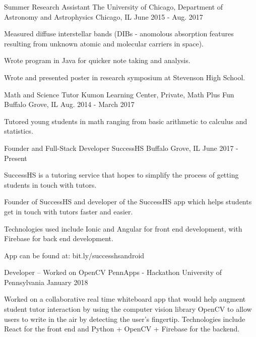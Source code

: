 \begin{cventries}
  \cventry
    {Summer Research Assistant}
    {The University of Chicago, Department of Astronomy and Astrophysics}
    {Chicago, IL}
    {June 2015 - Aug. 2017} 
    {
      \begin{cvitems}
        \item {Measured diffuse interstellar bands (DIBs - anomolous absorption features resulting from unknown atomic and molecular carriers in space).}
        \item {Wrote program in Java for quicker note taking and analysis.}
        \item {Wrote and presented poster in research symposium at Stevenson High School.}
      \end{cvitems}
    }
  \cventry
    {Math and Science Tutor}
    {Kumon Learning Center, Private, Math Plus Fun}
    {Buffalo Grove, IL}
    {Aug. 2014 - March 2017}
    {
      \begin{cvitems}
        \item {Tutored young students in math ranging from basic arithmetic to calculus and statistics.}
      \end{cvitems}
    }
  \cventry
    {Founder and Full-Stack Developer}
    {SuccessHS}
    {Buffalo Grove, IL}
    {June 2017 - Present}
    {
      \begin{cvitems}
        \item {SuccessHS is a tutoring service that hopes to simplify the process of getting students in touch with tutors.}
        \item {Founder of SuccessHS and developer of the SuccessHS app which helps students get in touch with tutors faster and easier.}
        \item {Technologies used include Ionic and Angular for front end development, with Firebase for back end development.}
        \item {App can be found at: bit.ly/successhsandroid}
      \end{cvitems}
    }
    
    \cventry
      {Developer -- Worked on OpenCV}
      {PennApps - Hackathon}
      {University of Pennsylvania}
      {January 2018}
      {
        \begin{cvitems}
            \item Worked on a collaborative real time whiteboard app that would help augment student tutor interaction by using the computer vision library OpenCV to allow users to write in the air by detecting the user's fingertip. Technologies include React for the front end and Python + OpenCV + Firebase for the backend.
        \end{cvitems}
    }
\end{cventries}
